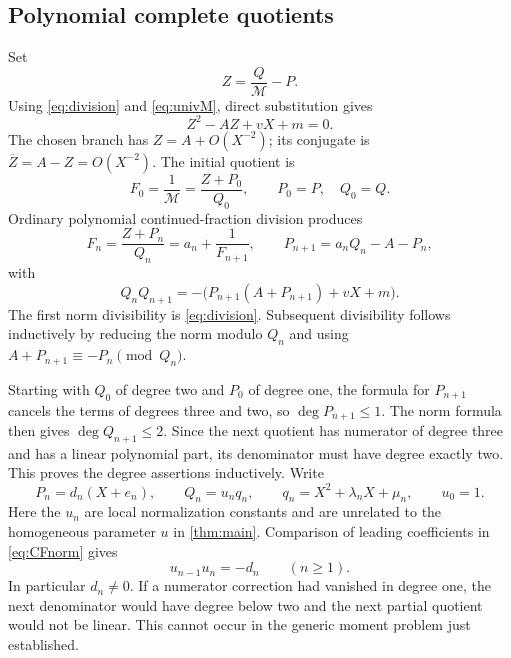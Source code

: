 \documentclass[11pt,a4paper]{article}
\numberwithin{equation}{section}
\theoremstyle{definition}
\begin{document}
\subsection{Polynomial complete quotients}
Set
\begin{equation}\label{eq:Zuniv}
 Z=\frac{Q}{\mathcal M}-P.
\end{equation}
Using \eqref{eq:division} and \eqref{eq:univM}, direct substitution gives
\begin{equation}\label{eq:Zquad}
 Z^2-AZ+vX+m=0.
\end{equation}
The chosen branch has $Z=A+O(X^{-2})$; its conjugate is
$\overline Z=A-Z=O(X^{-2})$. The initial quotient is
\[
 F_0=\frac1{\mathcal M}=\frac{Z+P_0}{Q_0},\qquad P_0=P,\quad Q_0=Q.
\]
Ordinary polynomial continued-fraction division produces
\begin{equation}\label{eq:CFstep}
 F_n=\frac{Z+P_n}{Q_n}=a_n+\frac1{F_{n+1}},\qquad
 P_{n+1}=a_nQ_n-A-P_n,
\end{equation}
with
\begin{equation}\label{eq:CFnorm}
 Q_nQ_{n+1}=-\bigl(P_{n+1}(A+P_{n+1})+vX+m\bigr).
\end{equation}
The first norm divisibility is \eqref{eq:division}. Subsequent divisibility
follows inductively by reducing the norm modulo $Q_n$ and using
$A+P_{n+1}\equiv-P_n\pmod{Q_n}$.

Starting with $Q_0$ of degree two and $P_0$ of degree one, the formula for
$P_{n+1}$ cancels the terms of degrees three and two, so $\deg P_{n+1}\leq1$.
The norm formula then gives $\deg Q_{n+1}\leq2$. Since the next quotient has
numerator of degree three and has a linear polynomial part, its denominator
must have degree exactly two. This proves the degree assertions inductively.
Write
\begin{equation}\label{eq:normal}
 P_n=d_n(X+e_n),\qquad
 Q_n=u_nq_n,\qquad q_n=X^2+\lambda_nX+\mu_n,
 \qquad u_0=1.
\end{equation}
Here the $u_n$ are local normalization constants and are unrelated to the
homogeneous parameter $u$ in \cref{thm:main}. Comparison of leading
coefficients in \eqref{eq:CFnorm} gives
\begin{equation}\label{eq:unprod}
 u_{n-1}u_n=-d_n\qquad(n\geq1).
\end{equation}
In particular $d_n\ne0$. If a numerator correction had vanished in degree
one, the next denominator would have degree below two and the next partial
quotient would not be linear. This cannot occur in the generic moment
problem just established.
\end{document}

